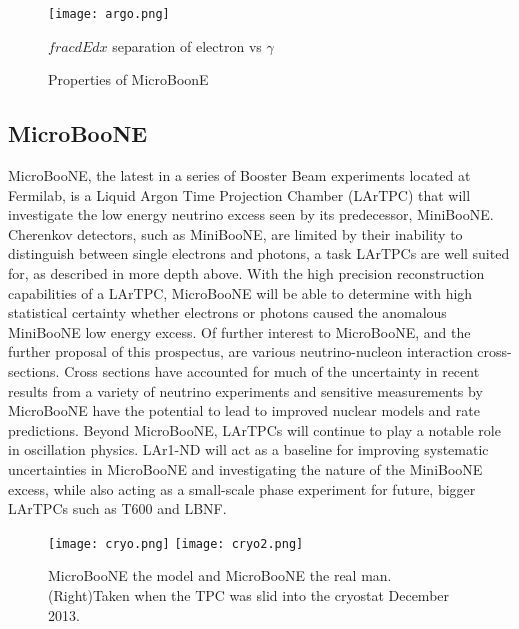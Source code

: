 \documentclass[12pt]{article}
\begin{document}
\begin{figure}[h!]
\centering
\texttt{[image: argo.png]}
\caption{ $frac{dE}{dx}$ separation of electron vs $\gamma$ \cite{szelc}} 
\end{figure}

\begin{wrapfigure}{r}{0.3\textwidth}
\begin{center}

\end{center}
\caption{Properties of MicroBoonE}
\end{wrapfigure}

\color{black}
\subsection{MicroBooNE}

MicroBooNE, the latest in a series of Booster Beam experiments located at Fermilab, is a Liquid Argon Time Projection Chamber (LArTPC) that will investigate the low energy neutrino excess seen by its predecessor, MiniBooNE. Cherenkov detectors, such as MiniBooNE, are limited by their inability to distinguish between single electrons and photons, a task LArTPCs are well suited for, as described in more depth above. With the high precision reconstruction capabilities of a LArTPC, MicroBooNE will be able to determine with high statistical certainty whether electrons or photons caused the anomalous MiniBooNE low energy excess. Of further interest to MicroBooNE, and the further proposal of this prospectus, are various neutrino-nucleon interaction cross-sections. Cross sections have accounted for much of the uncertainty in recent results from a variety of neutrino experiments\cite{miniboone} and sensitive measurements by MicroBooNE have the potential to lead to improved nuclear models and rate predictions. Beyond MicroBooNE, LArTPCs will continue to play a notable role in oscillation physics. LAr1-ND will act as a baseline for improving systematic uncertainties in MicroBooNE and investigating the nature of the MiniBooNE excess, while also acting as a small-scale phase experiment for future, bigger LArTPCs such as T600 and LBNF. 
\begin{figure}[h!]
\texttt{[image: cryo.png]}
\hspace{2 cm}
\texttt{[image: cryo2.png]}
\caption{MicroBooNE the model and MicroBooNE the real man. (Right)Taken when the TPC was slid into the cryostat December 2013.}
\end{figure}
\end{document}
